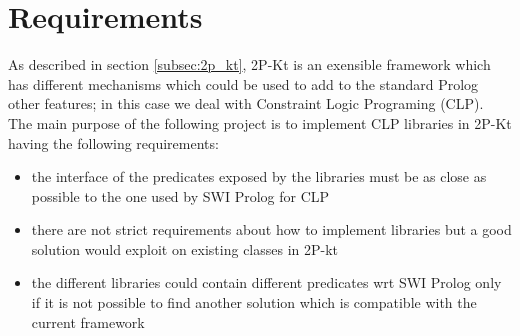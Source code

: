 \section{Requirements}\label{sec:Requirements}

As described in section \ref{subsec:2p_kt}, 2P-Kt is an exensible framework which has different mechanisms
which could be used to add to the standard Prolog other features; in this case we deal with Constraint Logic Programing (CLP).\newline
The main purpose of the following project is to implement CLP libraries in 2P-Kt having the following requirements:\newline
\begin{itemize}
    \item the interface of the predicates exposed by the libraries must be as close as possible to the one used by SWI Prolog for CLP
    \item there are not strict requirements about how to implement libraries but a good solution would exploit on existing classes in 2P-kt
    \item the different libraries could contain different predicates wrt SWI Prolog only if it is not possible to find another solution which is compatible with the current framework
\end{itemize}

